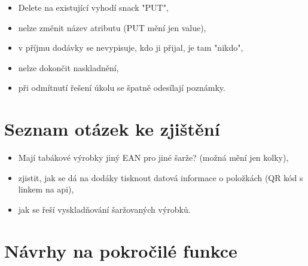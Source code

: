 \begin{itemize}
	\item Delete na existující vyhodí snack "PUT",
	\item nelze změnit název atributu (PUT mění jen value),
	\item v příjmu dodávky se nevypisuje, kdo ji přijal, je tam "nikdo",
	\item nelze dokončit naskladnění,
	\item při odmítnutí řešení úkolu se špatně odesílají poznámky.
\end{itemize}

\section{Seznam otázek ke zjištění}

\begin{itemize}
	\item Mají tabákové výrobky jiný EAN pro jiné šarže? (možná mění jen kolky),
	\item zjistit, jak se dá na dodáky tisknout datová informace o položkách (QR kód s linkem na api),
	\item jak se řeší vyskladňování šaržovaných výrobků.
\end{itemize}

\section{Návrhy na pokročilé funkce}


